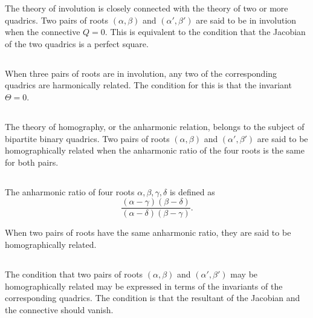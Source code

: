 \documentclass[11pt,a4paper]{book}
\begin{document}
\begin{center}
The theory of involution is closely connected with the theory of two or more quadrics. Two pairs of roots $(\alpha, \beta)$ and $(\alpha', \beta')$ are said to be in involution when the connective $Q = 0$. This is equivalent to the condition that the Jacobian of the two quadrics is a perfect square.

\subsection{}

When three pairs of roots are in involution, any two of the corresponding quadrics are harmonically related. The condition for this is that the invariant $\Theta = 0$.

\subsection{}

The theory of homography, or the anharmonic relation, belongs to the subject of bipartite binary quadrics. Two pairs of roots $(\alpha, \beta)$ and $(\alpha', \beta')$ are said to be homographically related when the anharmonic ratio of the four roots is the same for both pairs.

\subsection{}

The anharmonic ratio of four roots $\alpha, \beta, \gamma, \delta$ is defined as
\[
\frac{(\alpha - \gamma)(\beta - \delta)}{(\alpha - \delta)(\beta - \gamma)}.
\]

When two pairs of roots have the same anharmonic ratio, they are said to be homographically related.

\subsection{}

The condition that two pairs of roots $(\alpha, \beta)$ and $(\alpha', \beta')$ may be homographically related may be expressed in terms of the invariants of the corresponding quadrics. The condition is that the resultant of the Jacobian and the connective should vanish.

\subsection{}


\end{center}
\end{document}
